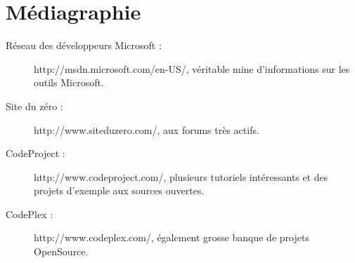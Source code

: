 \chapter*{Médiagraphie}

\begin{description}
\item[Réseau des développeurs Microsoft :] http://msdn.microsoft.com/en-US/, véritable mine d'informations sur les outils Microsoft.
\item[Site du zéro :] http://www.siteduzero.com/, aux forums très actifs.
\item[CodeProject :] http://www.codeproject.com/, plusieurs tutoriels intéressants et des projets d'exemple aux sources ouvertes.
\item[CodePlex :] http://www.codeplex.com/, également grosse banque de projets OpenSource.

\end{description}